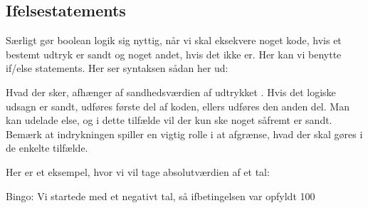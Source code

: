 \documentclass[letterpaper,10pt,english]{jupyterBook}
\begin{document}
\subsection{If\sphinxhyphen{}else\sphinxhyphen{}statements}
\label{\detokenize{notebooks/Andet_python:if-else-statements}}
Særligt gør boolean logik sig nyttig, når vi skal eksekvere noget kode, hvis et bestemt udtryk er sandt og noget andet, hvis det ikke er. Her kan vi benytte if/else statements. Her ser syntaksen sådan her ud:

\begin{sphinxVerbatim}[commandchars=\\\{\}]
 
        
        
\end{sphinxVerbatim}

Hvad der sker, afhænger af sandhedsværdien af udtrykket . Hvis det logiske udsagn  er sandt, udføres første del af koden, ellers udføres den anden del. Man kan udelade else, og i dette tilfælde vil der kun ske noget såfremt  er sandt.
Bemærk at indrykningen spiller en vigtig rolle i at afgrænse, hvad der skal gøres i de enkelte tilfælde.

Her er et eksempel, hvor vi vil tage absolutværdien af et tal:

\begin{sphinxVerbatim}[commandchars=\\\{\}]
  
    
          
\end{sphinxVerbatim}

\begin{sphinxVerbatim}[commandchars=\\\{\}]
Bingo: Vi startede med et negativt tal, så if\PYGZhy{}betingelsen var opfyldt
100
\end{sphinxVerbatim}
\end{document}
